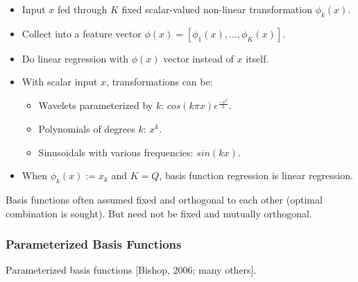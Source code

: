 \documentclass{article}
\begin{document}
\begin{itemize}
    \item Input $x$ fed through $K$ fixed scalar-valued non-linear transformation $\phi_k(x)$.
    \item Collect into a feature vector $\phi(x) = [\phi_1(x),\dots,\phi_K(x)]$.
    \item Do linear regression with $\phi(x)$ vector instead of $x$ itself.
    \item With scalar input $x$, transformations can be:
    \begin{itemize}
        \item Wavelets parameterized by $k$: $cos(k \pi x)e^{\frac{-x^2}{2}}$.
        \item Polynomials of degrees $k$: $x^k$.
        \item Sinusoidals with various frequencies: $sin(kx)$.
    \end{itemize}
    \item When $\phi_k(x) := x_k$ and $K = Q$, basis function regression is linear regression.
\end{itemize}

Basis functions often assumed fixed and orthogonal to each other (optimal combination is sought).
But need not be fixed and mutually orthogonal.

\subsubsection{Parameterized Basis Functions}

Parameterized basis functions [Bishop, 2006; many others].
\end{document}
